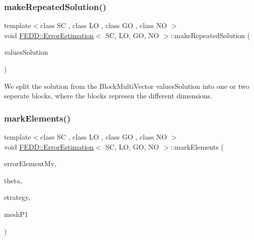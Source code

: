 \subsubsection{\texorpdfstring{make\+Repeated\+Solution()}{makeRepeatedSolution()}}
{\footnotesize\ttfamily template$<$class SC , class LO , class GO , class NO $>$ \\
void \hyperlink{classFEDD_1_1ErrorEstimation}{F\+E\+D\+D\+::\+Error\+Estimation}$<$ SC, LO, GO, NO $>$\+::make\+Repeated\+Solution (\begin{DoxyParamCaption}\item[{\hyperlink{classFEDD_1_1ErrorEstimation_a8a53d809dfcf71abaffe46f85e6b4aa1}{Block\+Multi\+Vector\+Const\+Ptr\+\_\+\+Type}}]{values\+Solution }\end{DoxyParamCaption})}



We split the solution from the Block\+Multi\+Vector values\+Solution into one or two seperate blocks, where the blocks represen the different dimensions. 

\mbox{\label{classFEDD_1_1ErrorEstimation_ae06a1a8d7f551986e5d8bcd6a2303455}} 
\subsubsection{\texorpdfstring{mark\+Elements()}{markElements()}}
{\footnotesize\ttfamily template$<$class SC , class LO , class GO , class NO $>$ \\
void \hyperlink{classFEDD_1_1ErrorEstimation}{F\+E\+D\+D\+::\+Error\+Estimation}$<$ SC, LO, GO, NO $>$\+::mark\+Elements (\begin{DoxyParamCaption}\item[{\hyperlink{classFEDD_1_1ErrorEstimation_a5882ff373bf8c409b407b4fd1f42bda0}{Multi\+Vector\+Ptr\+\_\+\+Type}}]{error\+Element\+Mv,  }\item[{double}]{theta,  }\item[{string}]{strategy,  }\item[{\hyperlink{classFEDD_1_1ErrorEstimation_a862043dc355a1524640b5ef53e8eefa1}{Mesh\+Unstr\+Ptr\+\_\+\+Type}}]{mesh\+P1 }\end{DoxyParamCaption})}



